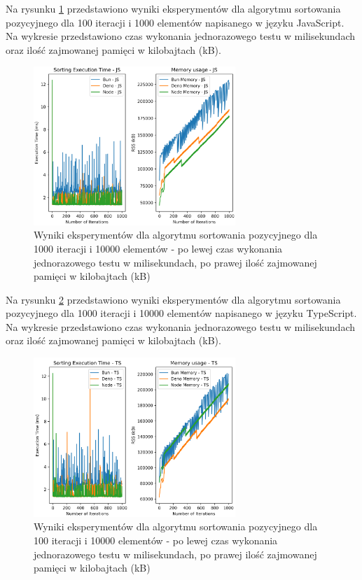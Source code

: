 Na rysunku \ref{fig:radix_sorting_e4} przedstawiono wyniki eksperymentów dla algorytmu sortowania pozycyjnego dla 100 iteracji i 1000 elementów napisanego w języku JavaScript. Na wykresie przedstawiono czas wykonania jednorazowego testu w milisekundach oraz ilość zajmowanej pamięci w kilobajtach (kB).

\begin{figure}[H]
  \centering
  \includegraphics[width=0.68\textwidth]{Figures/sorting/sorting_radix_1000_10000_js.png}
  \caption{Wyniki eksperymentów dla algorytmu sortowania pozycyjnego dla 1000 iteracji i 10000 elementów - po lewej czas wykonania jednorazowego testu w milisekundach, po prawej ilość zajmowanej pamięci w kilobajtach (kB)}
  \label{fig:radix_sorting_e4}
\end{figure}

Na rysunku \ref{fig:radix_sorting_e4_ts} przedstawiono wyniki eksperymentów dla algorytmu sortowania pozycyjnego dla 1000 iteracji i 10000 elementów napisanego w języku TypeScript. Na wykresie przedstawiono czas wykonania jednorazowego testu w milisekundach oraz ilość zajmowanej pamięci w kilobajtach (kB).

\begin{figure}[H]
  \centering
  \includegraphics[width=0.68\textwidth]{Figures/sorting/sorting_radix_1000_10000_ts.png}
  \caption{Wyniki eksperymentów dla algorytmu sortowania pozycyjnego dla 100 iteracji i 10000 elementów - po lewej czas wykonania jednorazowego testu w milisekundach, po prawej ilość zajmowanej pamięci w kilobajtach (kB)}
  \label{fig:radix_sorting_e4_ts}
\end{figure}

